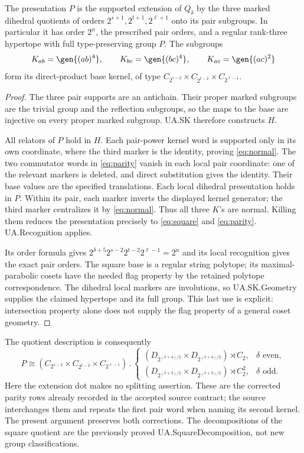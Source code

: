 \begin{theorem}\label{cor:hypertope}
The presentation $P$ is the supported extension of $Q_\delta$ by the three
marked dihedral quotients of orders $2^{s+1},2^{t+1},2^{\ell+1}$ onto
its pair subgroups. In particular it has order $2^n$, the prescribed pair
orders, and a regular rank-three hypertope with full type-preserving group
$P$. The subgroups
\[
 K_{ab}=\gen{(ab)^4},\qquad K_{bc}=\gen{(bc)^4},\qquad
 K_{ac}=\gen{(ac)^2}
\]
form its direct-product base kernel, of type
$C_{2^{s-2}}\times C_{2^{t-2}}\times C_{2^{\ell-1}}$.
\end{theorem}
\begin{proof}
The three pair supports are an antichain. Their proper marked subgroups
are the trivial group and the reflection subgroups, so the maps to the
base are injective on every proper marked subgroup. UA.SK therefore
constructs $H$.

All relators of $P$ hold in $H$. Each pair-power kernel word is supported
only in its own coordinate, where the third marker is the identity, proving
\eqref{eq:normal}. The two commutator words in \eqref{eq:parity} vanish in
each local pair coordinate: one of the relevant markers is deleted, and
direct substitution gives the identity. Their base values are the specified
translations. Each local dihedral presentation holds in $P$. Within its
pair, each marker inverts the displayed kernel generator; the third marker
centralizes it by \eqref{eq:normal}. Thus all three $K$'s are normal.
Killing them reduces the presentation precisely to \eqref{eq:square} and
\eqref{eq:parity}. UA.Recognition applies.

Its order formula gives
$2^{\delta+5}2^{s-2}2^{t-2}2^{\ell-1}=2^n$ and its local recognition gives
the exact pair orders. The square base is a regular string polytope; its
maximal-parabolic cosets have the needed flag property by the retained
polytope correspondence. The dihedral local markers are involutions, so
UA.SK.Geometry supplies the claimed hypertope and its full group. This
last use is explicit: intersection property alone does not supply the flag
property of a general coset geometry.
\end{proof}

The quotient description is consequently
\[
 P\cong
 (C_{2^{s-2}}\times C_{2^{t-2}}\times C_{2^{\ell-1}})\mathbin{.}
 \begin{cases}
 (D_{2^{(\delta+4)/2}}\times D_{2^{(\delta+4)/2}})\rtimes C_2,
       &\delta\text{ even},\\
 (D_{2^{(\delta+3)/2}}\times D_{2^{(\delta+3)/2}})\rtimes C_2^2,
       &\delta\text{ odd}.
 \end{cases}
\]
Here the extension dot makes no splitting assertion. These are the corrected
parity rows already recorded in the accepted source contract; the source
interchanges them and repeats the first pair word when naming its second
kernel. The present argument preserves both corrections. The decompositions
of the square quotient are the previously proved UA.SquareDecomposition,
not new group classifications.


